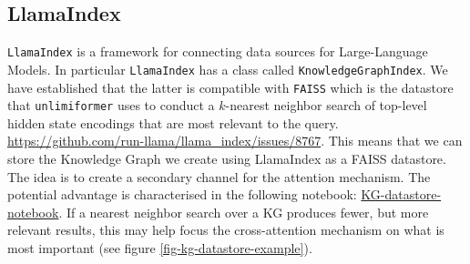 \subsection*{LlamaIndex}
\texttt{LlamaIndex} is a framework for connecting data sources for
Large-Language Models. In particular \texttt{LlamaIndex} has a class called
\texttt{KnowledgeGraphIndex}. We have established that the latter is compatible
with \texttt{FAISS} which is the datastore that \texttt{unlimiformer} uses to
conduct a $k$-nearest neighbor search of top-level hidden state encodings that
are most relevant to the query.
\url{https://github.com/run-llama/llama_index/issues/8767}.
This means that we can store the Knowledge Graph we create using LlamaIndex as
a FAISS datastore. The idea is to create a secondary channel for the attention
mechanism. The potential advantage is characterised in the following notebook:
\href{https://github.com/run-llama/llama_index/blob/main/docs/examples/index_structs/knowledge_graph/KnowledgeGraphIndex_vs_VectorStoreIndex_vs_CustomIndex_combined.ipynb}{KG-datastore-notebook}.
If a nearest neighbor search over a KG produces fewer, but more relevant
results, this may help focus the cross-attention mechanism on what is most
important (see figure \ref{fig-kg-datastore-example}).

